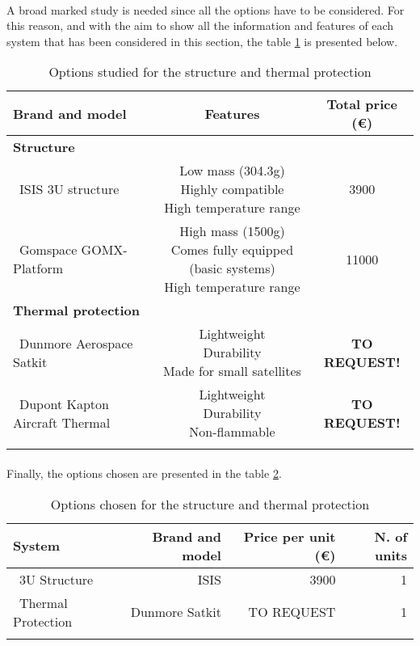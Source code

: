 \paragraph{}A broad marked study is needed since all the options have to be considered. For this reason, and with the aim to show all the information and features of each system that has been considered in this section, the table \ref{structureoptions} is presented below.


\begin{longtable}{| l | c | c | }
\hline
\rowcolor[gray]{0.80}	\textbf{Brand and model} &  \textbf{Features}     & \textbf{Total price (\euro)}   \\
\hline
\endfirsthead

\rowcolor[gray]{0.85} \textbf{Structure} &  &  \\
	   ~ISIS 3U structure & \makecell{Low mass (304.3g) \\ Highly compatible \\ High temperature range} & 3900 \\
	   \hline
	   ~Gomspace GOMX-Platform & \makecell{High mass (1500g) \\ Comes fully equipped (basic systems) \\ High temperature range} & 11000 \\
	   \hline
\rowcolor[gray]{0.85} \textbf{Thermal protection} &  &  \\
	   ~Dunmore Aerospace Satkit & \makecell{Lightweight \\ Durability \\ Made for small satellites}& \textbf{TO REQUEST!} \\
	   \hline
	   ~Dupont Kapton Aircraft Thermal & \makecell{Lightweight \\ Durability \\ Non-flammable} & \textbf{TO REQUEST!} \\
	\hline

\caption{Options studied for the structure and thermal protection}
\label{structureoptions}
\end{longtable}

\paragraph{}Finally, the options chosen are presented in the table \ref{structurefinal}.

\begin{longtable}{| l | r | r | r | }
\hline
\rowcolor[gray]{0.80}	\textbf{System} &  \textbf{Brand and model}     & \textbf{Price per unit (\euro)} & \textbf{N. of units}  \\
\hline
\endfirsthead

	   ~3U Structure & ISIS & 3900 & 1 \\
	   \hline
	   ~Thermal Protection & Dunmore Satkit & TO REQUEST & 1\\
	\hline

\caption{Options chosen for the structure and thermal protection}
\label{structurefinal}
\end{longtable}
